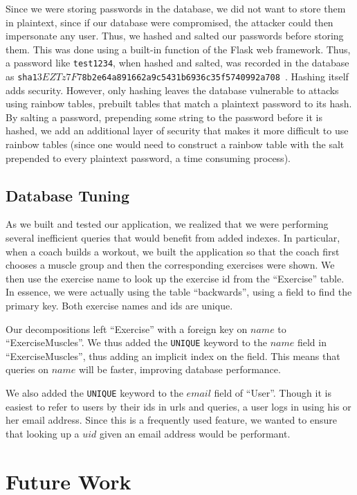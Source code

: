 \documentclass{article}
\begin{document}
Since we were storing passwords in the database, we did not want to store them
in plaintext, since if our database were compromised, the attacker could then
impersonate any user. Thus, we hashed and salted our passwords before storing them.
This was done using a built-in function of the Flask web framework. Thus,
a password like {\tt test1234}, when hashed and salted, was recorded in the
database as {\tt sha1$3EZTz7F7$8b2e64a891662a9c5431b6936c35f5740992a708 }. 
Hashing itself adds security. However, only hashing leaves the database vulnerable
to attacks using rainbow tables, prebuilt tables that match a plaintext password
to its hash. By salting a password, prepending some string to the password before
it is hashed, we add an additional layer of security that makes it more difficult
to use rainbow tables (since one would need to construct a rainbow table with the salt
prepended to every plaintext password, a time consuming process).

\subsection*{Database Tuning}

As we built and tested our application, we realized that we were performing several
inefficient queries that would benefit from added indexes. In particular, when 
a coach builds a workout, we built the application so that the coach first chooses
a muscle group and then the corresponding exercises were shown. We then use
the exercise name to look up the exercise id from the ``Exercise'' table. 
In essence, we were actually using the table ``backwards'', using a field
to find the primary key. Both exercise names and ids are unique.

Our decompositions left ``Exercise'' with a foreign key on $name$ 
to ``ExerciseMuscles''. We thus added the {\tt UNIQUE} keyword to the $name$
field in ``ExerciseMuscles'', thus adding an implicit index on the field. This
means that queries on $name$ will be faster, improving database performance.

We also added the {\tt UNIQUE} keyword to the $email$ field of ``User''. 
Though it is easiest to refer to users by their ids in urls and queries, a 
user logs in using his or her email address. Since this is a frequently used
feature, we wanted to ensure that looking up a $uid$ given an email address
would be performant. 

\section*{Future Work}
\end{document}

